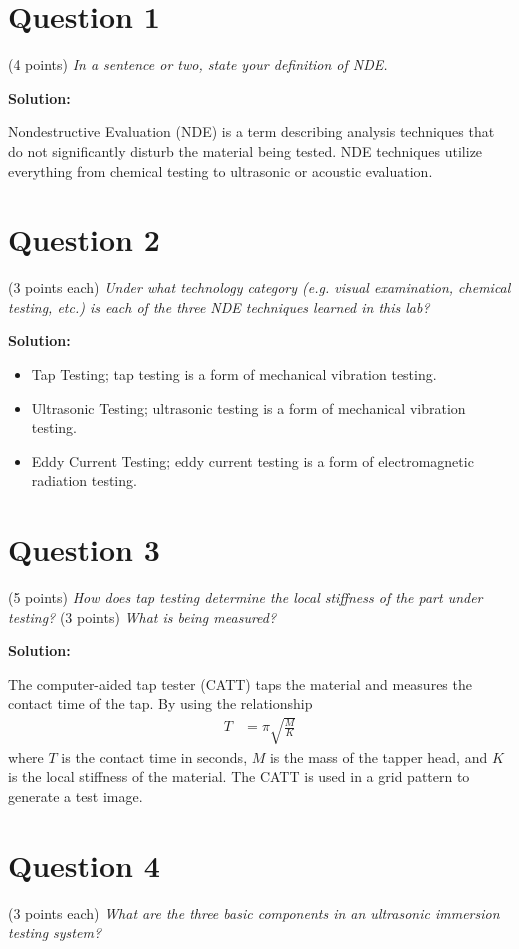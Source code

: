 \documentclass[12 pt]{article}
\begin{document}
\section*{Question 1}
(\num{4} points) \textit{In a sentence or two, state your definition of NDE.}

\textbf{Solution:}

Nondestructive Evaluation (NDE) is a term describing analysis techniques that do not significantly disturb the material being tested. NDE techniques utilize everything from chemical testing to ultrasonic or acoustic evaluation.

\section*{Question 2}
(\num{3} points each) \textit{Under what technology category (e.g. visual examination, chemical testing, etc.) is each of the three NDE techniques learned in this lab?}

\textbf{Solution:}

\begin{itemize}
	\item Tap Testing; tap testing is a form of mechanical vibration testing.
	\item Ultrasonic Testing; ultrasonic testing is a form of mechanical vibration testing.
	\item Eddy Current Testing; eddy current testing is a form of electromagnetic radiation testing.
\end{itemize}

\section*{Question 3}
(\num{5} points) \textit{How does tap testing determine the local stiffness of the part under testing?} (\num{3} points) \textit{What is being measured?}

\textbf{Solution:}

The computer-aided tap tester (CATT) taps the material and measures the contact time of the tap. By using the relationship
\begin{align}
	T&=\pi\sqrt{\frac{M}{K}}
\end{align}
where $T$ is the contact time in seconds, $M$ is the mass of the tapper head, and $K$ is the local stiffness of the material. The CATT is used in a grid pattern to generate a test image.

\section*{Question 4}
(\num{3} points each) \textit{What are the three basic components in an ultrasonic immersion testing system?}
\end{document}
